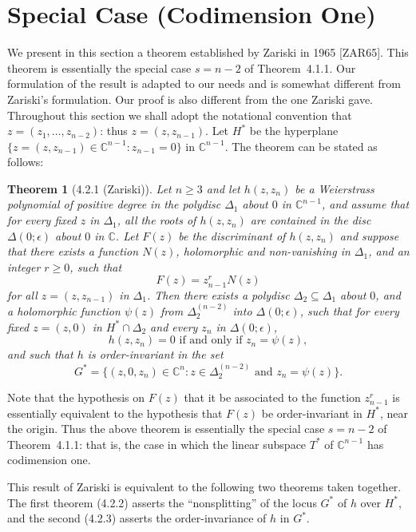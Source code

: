 \documentclass[11pt]{article}
\theoremstyle{plain}
\newtheorem*{theorem*}{Theorem}
\theoremstyle{definition}
\newcommand{\C}{\mathbb{C}}
\begin{document}
\section{Special Case (Codimension One)}

We present in this section a theorem established by Zariski in 1965
[ZAR65]. This theorem is essentially the special case $s = n-2$ of
Theorem~4.1.1. Our formulation of the result is adapted to our needs
and is somewhat different from Zariski's formulation. Our proof is
also different from the one Zariski gave. Throughout this section we
shall adopt the notational convention that $z = (z_1, \ldots, z_{n-2})$:
thus $z = (z, z_{n-1})$. Let $H^*$ be the hyperplane
$\{ z = (z, z_{n-1}) \in \C^{n-1} : z_{n-1} = 0 \}$ in $\C^{n-1}$. The
theorem can be stated as follows:

\begin{theorem*}[4.2.1 (Zariski)]
Let $n \ge 3$ and let $h(z, z_n)$ be a Weierstrass polynomial of
positive degree in the polydisc $\Delta_1$ about $0$ in $\C^{n-1}$,
and assume that for every fixed $z$ in $\Delta_1$, all the roots of
$h(z, z_n)$ are contained in the disc $\Delta(0; \epsilon)$ about $0$
in $\C$. Let $F(z)$ be the discriminant of $h(z, z_n)$ and suppose
that there exists a function $N(z)$, holomorphic and non-vanishing in
$\Delta_1$, and an integer $r \ge 0$, such that
\[
F(z) = z_{n-1}^r N(z)
\]
for all $z = (z, z_{n-1})$ in $\Delta_1$. Then there exists a polydisc
$\Delta_2 \subseteq \Delta_1$ about $0$, and a holomorphic function
$\psi(z)$ from $\Delta_2^{(n-2)}$ into $\Delta(0; \epsilon)$, such
that for every fixed $z = (z, 0)$ in $H^* \cap \Delta_2$ and every
$z_n$ in $\Delta(0; \epsilon)$,
\[
h(z, z_n) = 0 \text{ if and only if } z_n = \psi(z),
\]
and such that $h$ is order-invariant in the set
\begin{equation}
G^* = \{ (z, 0, z_n) \in \C^n : z \in \Delta_2^{(n-2)} \text{ and }
z_n = \psi(z) \}. \tag{4.2.1}
\end{equation}
\end{theorem*}

Note that the hypothesis on $F(z)$ that it be associated to the
function $z_{n-1}^r$ is essentially equivalent to the hypothesis that
$F(z)$ be order-invariant in $H^*$, near the origin. Thus the above
theorem is essentially the special case $s = n-2$ of Theorem~4.1.1:
that is, the case in which the linear subspace $T^*$ of $\C^{n-1}$
has codimension one.

This result of Zariski is equivalent to the following two theorems
taken together. The first theorem (4.2.2) asserts the ``nonsplitting''
of the locus $G^*$ of $h$ over $H^*$, and the second (4.2.3) asserts
the order-invariance of $h$ in $G^*$.
\end{document}
